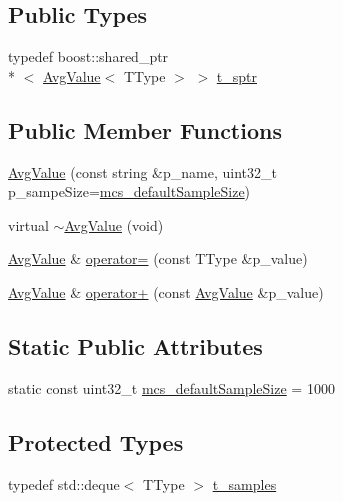 \subsection*{Public Types}
\begin{DoxyCompactItemize}
\item 
typedef boost\-::shared\-\_\-ptr\\*
$<$ \hyperlink{classxtd_1_1counters_1_1AvgValue}{Avg\-Value}$<$ T\-Type $>$ $>$ \hyperlink{classxtd_1_1counters_1_1AvgValue_a2186c119cedc1cd9c3a7a7a39e0bdc55}{t\-\_\-sptr}
\end{DoxyCompactItemize}
\subsection*{Public Member Functions}
\begin{DoxyCompactItemize}
\item 
\hyperlink{classxtd_1_1counters_1_1AvgValue_aa6f20ce5b30cc7a781669cd6e4f70a6b}{Avg\-Value} (const string \&p\-\_\-name, uint32\-\_\-t p\-\_\-sampe\-Size=\hyperlink{classxtd_1_1counters_1_1AvgValue_aa65f0400547f2cb940ec9b79cbc3a662}{mcs\-\_\-default\-Sample\-Size})
\item 
virtual \hyperlink{classxtd_1_1counters_1_1AvgValue_ad9e1d371b0787698ebdf0350e58601c8}{$\sim$\-Avg\-Value} (void)
\item 
\hyperlink{classxtd_1_1counters_1_1AvgValue}{Avg\-Value} \& \hyperlink{classxtd_1_1counters_1_1AvgValue_a9605750713e85b4bf2e09e54e46d4e1a}{operator=} (const T\-Type \&p\-\_\-value)
\item 
\hyperlink{classxtd_1_1counters_1_1AvgValue}{Avg\-Value} \& \hyperlink{classxtd_1_1counters_1_1AvgValue_a52054872a2d938baf8c23e1208d7613a}{operator+} (const \hyperlink{classxtd_1_1counters_1_1AvgValue}{Avg\-Value} \&p\-\_\-value)
\end{DoxyCompactItemize}
\subsection*{Static Public Attributes}
\begin{DoxyCompactItemize}
\item 
static const uint32\-\_\-t \hyperlink{classxtd_1_1counters_1_1AvgValue_aa65f0400547f2cb940ec9b79cbc3a662}{mcs\-\_\-default\-Sample\-Size} = 1000
\end{DoxyCompactItemize}
\subsection*{Protected Types}
\begin{DoxyCompactItemize}
\item 
typedef std\-::deque$<$ T\-Type $>$ \hyperlink{classxtd_1_1counters_1_1AvgValue_aa58af8a852f52342b087373414e61878}{t\-\_\-samples}
\end{DoxyCompactItemize}
